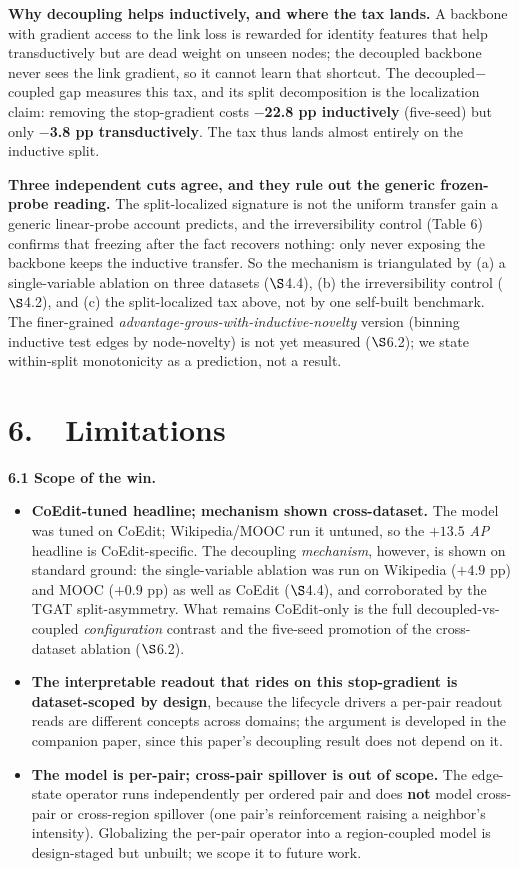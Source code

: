 \documentclass[conference]{IEEEtran}
\begin{document}
\textbf{Why decoupling helps inductively, and where the tax lands.} A backbone with gradient access to the link loss is rewarded for identity features that help transductively but are dead weight on unseen nodes; the decoupled backbone never sees the link gradient, so it cannot learn that shortcut. The decoupled$-$coupled gap measures this tax, and its split decomposition is the localization claim: removing the stop-gradient costs \textbf{$-$22.8 pp inductively} (five-seed) but only \textbf{$-$3.8 pp transductively}. The tax thus lands almost entirely on the inductive split.

\textbf{Three independent cuts agree, and they rule out the generic frozen-probe reading.} The split-localized signature is not the uniform transfer gain a generic linear-probe account predicts, and the irreversibility control (Table 6) confirms that freezing after the fact recovers nothing: only never exposing the backbone keeps the inductive transfer. So the mechanism is triangulated by (a) a single-variable ablation on three datasets ($\S$4.4), (b) the irreversibility control ($\S$4.2), and (c) the split-localized tax above, not by one self-built benchmark. The finer-grained \emph{advantage-grows-with-inductive-novelty} version (binning inductive test edges by node-novelty) is not yet measured ($\S$6.2); we state within-split monotonicity as a prediction, not a result.

\section*{6.~~Limitations}

\textbf{6.1 Scope of the win.}
\begin{itemize}
\item \textbf{CoEdit-tuned headline; mechanism shown cross-dataset.} The model was tuned on CoEdit; Wikipedia/MOOC run it untuned, so the $+13.5$ \emph{AP} headline is CoEdit-specific. The decoupling \emph{mechanism}, however, is shown on standard ground: the single-variable ablation was run on Wikipedia ($+4.9$ pp) and MOOC ($+0.9$ pp) as well as CoEdit ($\S$4.4), and corroborated by the TGAT split-asymmetry. What remains CoEdit-only is the full decoupled-vs-coupled \emph{configuration} contrast and the five-seed promotion of the cross-dataset ablation ($\S$6.2).
\item \textbf{The interpretable readout that rides on this stop-gradient is dataset-scoped by design}, because the lifecycle drivers a per-pair readout reads are different concepts across domains; the argument is developed in the companion paper, since this paper's decoupling result does not depend on it.
\item \textbf{The model is per-pair; cross-pair spillover is out of scope.} The edge-state operator runs independently per ordered pair and does \textbf{not} model cross-pair or cross-region spillover (one pair's reinforcement raising a neighbor's intensity). Globalizing the per-pair operator into a region-coupled model is design-staged but unbuilt; we scope it to future work.
\end{itemize}
\end{document}
